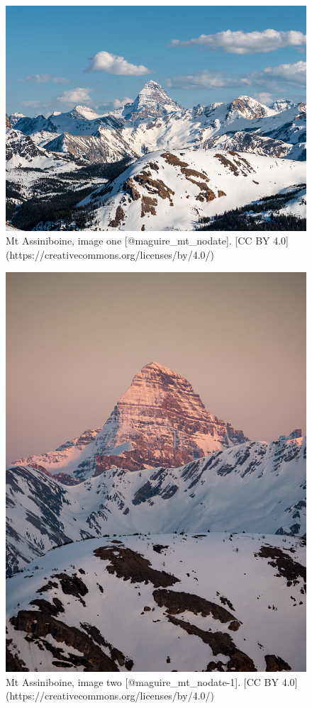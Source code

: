 \documentclass[
]{book}
\begin{document}
\begin{figure}
\includegraphics[width=0.9\linewidth]{images/12-assiniboine_day} \caption{Mt Assiniboine, image one [@maguire_mt_nodate]. [CC BY 4.0](https://creativecommons.org/licenses/by/4.0/)}\label{fig:12-assiniboine-day}
\end{figure}

\begin{figure}
\includegraphics[width=0.9\linewidth]{images/12-assiniboine_sunset} \caption{Mt Assiniboine, image two [@maguire_mt_nodate-1]. [CC BY 4.0](https://creativecommons.org/licenses/by/4.0/)}\label{fig:12-assiniboine-sunset}
\end{figure}
\end{document}
